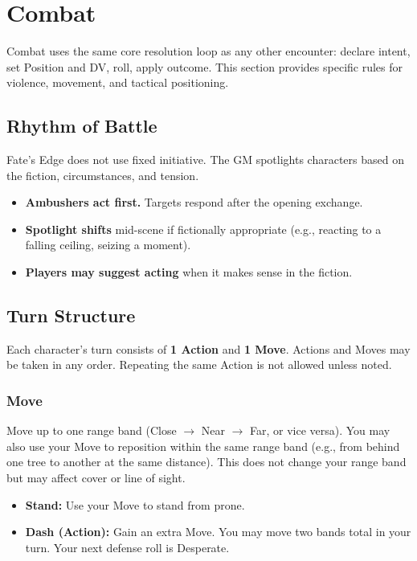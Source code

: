 
\section{Combat}

Combat uses the same core resolution loop as any other encounter: declare intent, set Position and DV, roll, apply outcome. This section provides specific rules for violence, movement, and tactical positioning.

\subsection{Rhythm of Battle}

Fate's Edge does not use fixed initiative. The GM spotlights characters based on the fiction, circumstances, and tension.

\begin{itemize}
  \item \textbf{Ambushers act first.} Targets respond after the opening exchange.
  \item \textbf{Spotlight shifts} mid-scene if fictionally appropriate (e.g., reacting to a falling ceiling, seizing a moment).
  \item \textbf{Players may suggest acting} when it makes sense in the fiction.
\end{itemize}

\subsection{Turn Structure}

Each character's turn consists of \textbf{1 Action} and \textbf{1 Move}. Actions and Moves may be taken in any order. Repeating the same Action is not allowed unless noted.

\subsubsection{Move}
Move up to one range band (Close $\rightarrow$ Near $\rightarrow$ Far, or vice versa). You may also use your Move to reposition within the same range band (e.g., from behind one tree to another at the same distance). This does not change your range band but may affect cover or line of sight.

\begin{itemize}
  \item \textbf{Stand:} Use your Move to stand from prone.
  \item \textbf{Dash (Action):} Gain an extra Move. You may move two bands total in your turn. Your next defense roll is Desperate.
\end{itemize}

